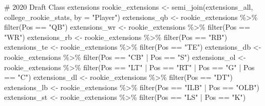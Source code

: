 \documentclass[
  letterpaper,
  DIV=11,
  numbers=noendperiod]{scrartcl}
\newenvironment{Shaded}{\begin{snugshade}}{\end{snugshade}}
\newcommand{\AttributeTok}[1]{\textcolor[rgb]{0.40,0.45,0.13}{#1}}
\newcommand{\CommentTok}[1]{\textcolor[rgb]{0.37,0.37,0.37}{#1}}
\newcommand{\FunctionTok}[1]{\textcolor[rgb]{0.28,0.35,0.67}{#1}}
\newcommand{\NormalTok}[1]{\textcolor[rgb]{0.00,0.23,0.31}{#1}}
\newcommand{\OtherTok}[1]{\textcolor[rgb]{0.00,0.23,0.31}{#1}}
\newcommand{\SpecialCharTok}[1]{\textcolor[rgb]{0.37,0.37,0.37}{#1}}
\newcommand{\StringTok}[1]{\textcolor[rgb]{0.13,0.47,0.30}{#1}}
\begin{document}
\begin{Shaded}
\begin{Highlighting}[]
\CommentTok{\# 2020 Draft Class extensions}
\NormalTok{rookie\_extensions }\OtherTok{\textless{}{-}} \FunctionTok{semi\_join}\NormalTok{(extensions\_all, college\_rookie\_stats, }\AttributeTok{by =} \StringTok{"Player"}\NormalTok{)}
\NormalTok{extensions\_qb }\OtherTok{\textless{}{-}}\NormalTok{ rookie\_extensions }\SpecialCharTok{\%\textgreater{}\%} \FunctionTok{filter}\NormalTok{(Pos }\SpecialCharTok{==} \StringTok{"QB"}\NormalTok{)}
\NormalTok{extensions\_wr }\OtherTok{\textless{}{-}}\NormalTok{ rookie\_extensions }\SpecialCharTok{\%\textgreater{}\%} \FunctionTok{filter}\NormalTok{(Pos }\SpecialCharTok{==} \StringTok{"WR"}\NormalTok{)}
\NormalTok{extensions\_rb }\OtherTok{\textless{}{-}}\NormalTok{ rookie\_extensions }\SpecialCharTok{\%\textgreater{}\%} \FunctionTok{filter}\NormalTok{(Pos }\SpecialCharTok{==} \StringTok{"RB"}\NormalTok{)}
\NormalTok{extensions\_te }\OtherTok{\textless{}{-}}\NormalTok{ rookie\_extensions }\SpecialCharTok{\%\textgreater{}\%} \FunctionTok{filter}\NormalTok{(Pos }\SpecialCharTok{==} \StringTok{"TE"}\NormalTok{)}
\NormalTok{extensions\_db }\OtherTok{\textless{}{-}}\NormalTok{ rookie\_extensions }\SpecialCharTok{\%\textgreater{}\%} \FunctionTok{filter}\NormalTok{(Pos }\SpecialCharTok{==} \StringTok{"CB"} \SpecialCharTok{|}\NormalTok{ Pos }\SpecialCharTok{==} \StringTok{"S"}\NormalTok{)}
\NormalTok{extensions\_ol }\OtherTok{\textless{}{-}}\NormalTok{ rookie\_extensions }\SpecialCharTok{\%\textgreater{}\%} \FunctionTok{filter}\NormalTok{(Pos }\SpecialCharTok{==} \StringTok{"LT"} \SpecialCharTok{|}\NormalTok{ Pos }\SpecialCharTok{==} \StringTok{"RT"} \SpecialCharTok{|}\NormalTok{ Pos }\SpecialCharTok{==} \StringTok{"G"} \SpecialCharTok{|}\NormalTok{ Pos }\SpecialCharTok{==} \StringTok{"C"}\NormalTok{)}
\NormalTok{extensions\_dl }\OtherTok{\textless{}{-}}\NormalTok{ rookie\_extensions }\SpecialCharTok{\%\textgreater{}\%} \FunctionTok{filter}\NormalTok{(Pos }\SpecialCharTok{==} \StringTok{"DT"}\NormalTok{)}
\NormalTok{extensions\_lb }\OtherTok{\textless{}{-}}\NormalTok{ rookie\_extensions }\SpecialCharTok{\%\textgreater{}\%} \FunctionTok{filter}\NormalTok{(Pos }\SpecialCharTok{==} \StringTok{"ILB"} \SpecialCharTok{|}\NormalTok{ Pos }\SpecialCharTok{==} \StringTok{"OLB"}\NormalTok{)}
\NormalTok{extensions\_st }\OtherTok{\textless{}{-}}\NormalTok{ rookie\_extensions }\SpecialCharTok{\%\textgreater{}\%} \FunctionTok{filter}\NormalTok{(Pos }\SpecialCharTok{==} \StringTok{"LS"} \SpecialCharTok{|}\NormalTok{ Pos }\SpecialCharTok{==} \StringTok{"K"}\NormalTok{)}


\end{Highlighting}
\end{Shaded}
\end{document}
